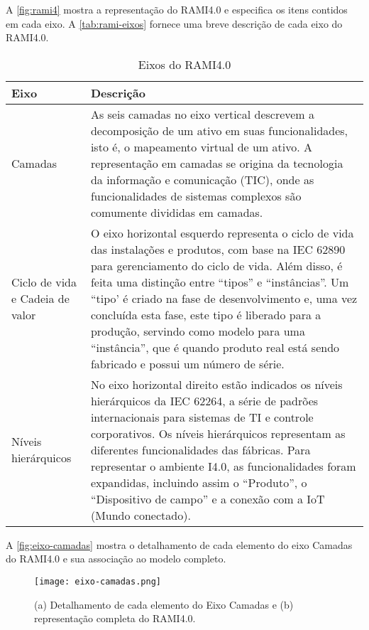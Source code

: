 	A \autoref{fig:rami4} mostra a representação do RAMI4.0 e especifica os itens contidos em cada eixo. A \autoref{tab:rami-eixos} fornece uma breve descrição de cada eixo do RAMI4.0.
	
	\begin{table}[htb]
		\centering
		\footnotesize
		\caption{Eixos do RAMI4.0}
		\label{tab:rami-eixos}
		\begin{tabular}{ |m{}|m{}| }
			\hline
			\textbf{Eixo} &\textbf{Descrição} \\
			
			\hline
			Camadas
			& As seis camadas no eixo vertical descrevem a decomposição de um ativo em suas funcionalidades, isto é, o mapeamento virtual de um ativo. A representação em camadas se origina da tecnologia da informação e comunicação (TIC), onde as funcionalidades de sistemas complexos são comumente divididas em camadas. \\
			
			
			\hline
			Ciclo de vida e  Cadeia de valor
			& O eixo horizontal esquerdo representa o ciclo de vida das instalações e produtos, com base na IEC 62890 para gerenciamento do ciclo de vida. Além disso, é feita uma distinção entre ``tipos'' e ``instâncias''. Um ``tipo' é criado na fase de desenvolvimento e, uma vez concluída esta fase, este tipo é liberado para a produção, servindo como modelo para uma ``instância'', que é quando produto real está sendo fabricado e possui um número de série. \\
			
			\hline
			Níveis hierárquicos
			& No eixo horizontal direito estão indicados os níveis hierárquicos da IEC 62264, a série de padrões internacionais para sistemas de TI e controle corporativos. Os níveis hierárquicos representam as diferentes funcionalidades das fábricas. Para representar o ambiente I4.0, as funcionalidades foram expandidas, incluindo assim o ``Produto'', o ``Dispositivo de campo'' e a conexão com a IoT (Mundo conectado). \\
			\hline
			
		\end{tabular}
	\end{table}

	A \autoref{fig:eixo-camadas} mostra o detalhamento de cada elemento do eixo Camadas do RAMI4.0 e sua associação ao modelo completo.
	
	\begin{figure}[htb]
		\centering
		\caption{(a) Detalhamento de cada elemento do Eixo Camadas e (b) representação completa do RAMI4.0.}
		\label{fig:eixo-camadas}
		\texttt{[image: eixo-camadas.png]}
	\end{figure}

